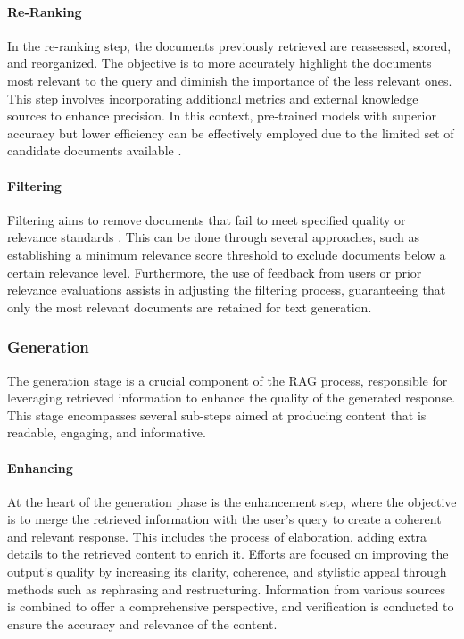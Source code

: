 \paragraph{Re-Ranking}
In the re-ranking step, the documents previously retrieved are reassessed, scored, and reorganized. The objective is to more accurately highlight the documents most relevant to the query and diminish the importance of the less relevant ones. This step involves incorporating additional metrics and external knowledge sources to enhance precision. In this context, pre-trained models with superior accuracy but lower efficiency can be effectively employed due to the limited set of candidate documents available \cite{DBLP:conf/sigir/HuangH09}. 

\paragraph{Filtering} Filtering aims to remove documents that fail to meet specified quality or relevance standards \cite{khattab2020colbert, DBLP:conf/ecai/HuangH23}. This can be done through several approaches, such as establishing a minimum relevance score threshold to exclude documents below a certain relevance level. Furthermore, the use of feedback from users or prior relevance evaluations assists in adjusting the filtering process, guaranteeing that only the most relevant documents are retained for text generation.

\subsubsection{Generation}
The generation stage is a crucial component of the RAG process, responsible for leveraging retrieved information to enhance the quality of the generated response. This stage encompasses several sub-steps aimed at producing content that is readable, engaging, and informative.

\paragraph{Enhancing}
At the heart of the generation phase is the enhancement step, where the objective is to merge the retrieved information with the user's query to create a coherent and relevant response. This includes the process of elaboration, adding extra details to the retrieved content to enrich it. Efforts are focused on improving the output's quality by increasing its clarity, coherence, and stylistic appeal through methods such as rephrasing and restructuring. Information from various sources is combined to offer a comprehensive perspective, and verification is conducted to ensure the accuracy and relevance of the content.

